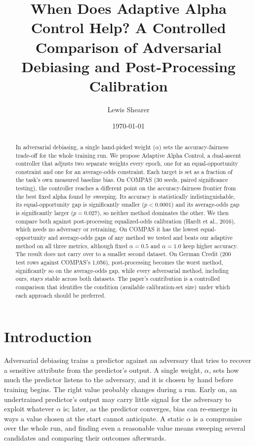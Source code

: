 \documentclass[11pt]{article}
\title{When Does Adaptive Alpha Control Help? A Controlled Comparison of
Adversarial Debiasing and Post-Processing Calibration}
\author{Lewis Shearer}
\date{\today}
\begin{document}
\maketitle

\begin{abstract}
In adversarial debiasing, a single hand-picked weight ($\alpha$) sets the
accuracy-fairness trade-off for the whole training run. We propose
Adaptive Alpha Control, a dual-ascent controller that adjusts two
separate weights every epoch, one for an equal-opportunity constraint
and one for an average-odds constraint. Each target is set as a fraction
of the task's own measured baseline bias. On COMPAS (30 seeds, paired
significance testing), the controller reaches a different point on the
accuracy-fairness frontier from the best fixed alpha found by sweeping.
Its accuracy is statistically indistinguishable, its equal-opportunity
gap is significantly smaller ($p<0.0001$) and its average-odds gap is
significantly larger ($p=0.027$), so neither method dominates the other.
We then compare both against post-processing equalized-odds calibration
(Hardt et al., 2016), which needs no adversary or retraining. On COMPAS
it has the lowest equal-opportunity and average-odds gaps of any method
we tested and beats our adaptive method on all three metrics, although
fixed $\alpha=0.5$ and $\alpha=1.0$ keep higher accuracy. The result
does not carry over to a smaller second dataset. On German Credit (200
test rows against COMPAS's 1{,}056), post-processing becomes the worst
method, significantly so on the average-odds gap, while every
adversarial method, including ours, stays stable across both datasets.
The paper's contribution is a controlled comparison that identifies the
condition (available calibration-set size) under which each approach
should be preferred.
\end{abstract}

\section{Introduction}

Adversarial debiasing \citep{zhang2018mitigating} trains a predictor
against an adversary that tries to recover a sensitive attribute from
the predictor's output. A single weight, $\alpha$, sets how much the
predictor listens to the adversary, and it is chosen by hand before
training begins. The right value probably changes during a run. Early
on, an undertrained predictor's output may carry little signal for the
adversary to exploit whatever $\alpha$ is; later, as the predictor
converges, bias can re-emerge in ways a value chosen at the start cannot
anticipate. A static $\alpha$ is a compromise over the whole run, and
finding even a reasonable value means sweeping several candidates and
comparing their outcomes afterwards.
\end{document}
